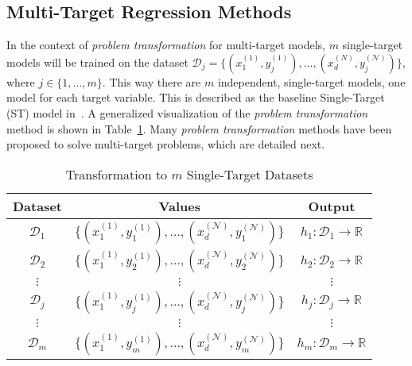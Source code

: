 \documentclass[preprint,12pt]{elsarticle}
\begin{document}
\subsection{Multi-Target Regression Methods}\label{subsec:mtr}
In the context of \textit{problem transformation} for multi-target models, $m$ single-target models will be trained on the dataset $\mathcal{D}_j = \{(x_1^{(1)},y_j^{(1)}), \ldots, (x_d^{(N)},y_j^{(\mathcal{N})})\}$, where $j \in \{1, \ldots, m\}$. This way there are $m$ independent, single-target models, one model for each target variable. This is described as the baseline Single-Target (ST) model in~\cite{Spyromitros2014}. A generalized visualization of the \textit{problem transformation} method is shown in Table~\ref{tab:pt}. Many \textit{problem transformation} methods have been proposed to solve multi-target problems, which are detailed next.

\begin{table}[!t]
\renewcommand{\arraystretch}{1.6}
\centering
\caption{Transformation to $m$ Single-Target Datasets}
\begin{tabular}{ccc}
\hline
Dataset & Values & Output \\
\hline
$\mathcal{D}_1$ & $\{(x_1^{(1)},y_1^{(1)}), \ldots, (x_d^{(\mathcal{N})},y_1^{(\mathcal{N})})\}$ & $h_1 : \mathcal{D}_1 \rightarrow \mathbb{R}$ \\
$\mathcal{D}_2$ & $\{(x_1^{(1)},y_2^{(1)}), \ldots, (x_d^{(\mathcal{N})},y_2^{(\mathcal{N})})\}$ & $h_2 : \mathcal{D}_2 \rightarrow \mathbb{R}$ \\
$\vdots$ & $\vdots$ & $\vdots$ \\
$\mathcal{D}_j$ & $\{(x_1^{(1)},y_j^{(1)}), \ldots, (x_d^{(\mathcal{N})},y_j^{(\mathcal{N})})\}$ & $h_j : \mathcal{D}_j \rightarrow \mathbb{R}$ \\
$\vdots$ & $\vdots$ & $\vdots$ \\
$\mathcal{D}_m$ & $\{(x_1^{(1)},y_m^{(1)}), \ldots, (x_d^{(\mathcal{N})},y_m^{(\mathcal{N})})\}$ & $h_m : \mathcal{D}_m \rightarrow \mathbb{R}$ \\
\hline
\end{tabular}
\label{tab:pt}
\end{table}
\end{document}
